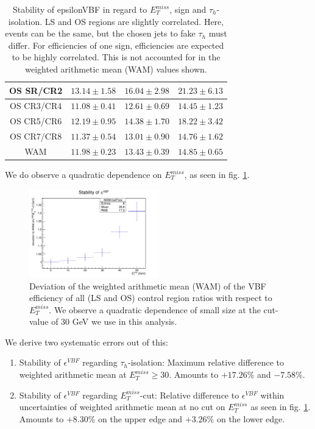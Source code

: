 \begin{table}[!h]
\begin{tabular}{|c||c|c|c|}
		OS SR/CR2  & $13.14\pm1.58$ & $16.04\pm2.98$ & $21.23\pm6.13$ \\ \hline
		OS CR3/CR4 & $11.08\pm0.41$ & $12.61\pm0.69$ & $14.45\pm1.23$ \\ \hline
		OS CR5/CR6 & $12.19\pm0.95$ & $14.38\pm1.70$ & $18.22\pm3.42$ \\ \hline
		OS CR7/CR8 & $11.37\pm0.54$ & $13.01\pm0.90$ & $14.76\pm1.62$ \\ \hline \hline
		WAM        & $11.98\pm0.23$ & $13.43\pm0.39$ & $14.85\pm0.65$ \\ \hline
	\end{tabular}
	\caption{Stability of epsilonVBF in regard to $E_{T}^{miss}$, sign and $\tau_{h}$-isolation. LS and OS regions are slightly correlated. Here, events can be the same, but the chosen jets to fake $\tau_{h}$ must differ. For efficiencies of one sign, efficiencies are expected to be highly correlated. This is not accounted for in the weighted arithmetic mean (WAM) values shown.}
	\label{dihad:tab:stability}
\end{table}
We do observe a quadratic dependence on $E_{T}^{miss}$, as seen in fig. \ref{dihad:fig:Stability}.

\begin{figure}[!h]
	\centering
	\includegraphics[width=0.5\textwidth]{PLOTS/diTauHadLSQCDPlots/stability/Stability.pdf}
	\caption{\label{dihad:fig:Stability}Deviation of the weighted arithmetic mean (WAM) of the VBF efficiency of all (LS and OS) control region ratios with respect to $E_{T}^{miss}$. We observe a quadratic dependence of small size at the cut-value of 30 GeV we use in this analysis.}
\end{figure}

We derive two systematic errors out of this:
\begin{enumerate}
	\item Stability of $\epsilon^{VBF}$ regarding $\tau_{h}$-isolation: Maximum relative difference to weighted arithmetic mean at $E_{T}^{miss}\geq30$. Amounts to $+17.26\%$ and $-7.58\%$.
	\item Stability of $\epsilon^{VBF}$ regarding $E_{T}^{miss}$-cut: Relative difference to $\epsilon^{VBF}$ within uncertainties of weighted arithmetic
	mean at no cut on $E_{T}^{miss}$ as seen in fig. \ref{dihad:fig:Stability}. Amounts to $+8.30\%$ on the upper edge and $+3.26\%$ on the lower edge.
\end{enumerate}

\clearpage



